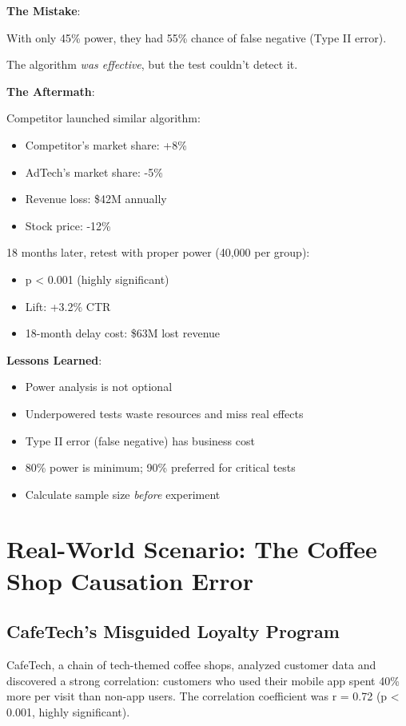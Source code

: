 \textbf{The Mistake}:

With only 45\% power, they had 55\% chance of false negative (Type II error).

The algorithm \textit{was effective}, but the test couldn't detect it.

\textbf{The Aftermath}:

Competitor launched similar algorithm:
\begin{itemize}
    \item Competitor's market share: +8\%
    \item AdTech's market share: -5\%
    \item Revenue loss: \$42M annually
    \item Stock price: -12\%
\end{itemize}

18 months later, retest with proper power (40,000 per group):
\begin{itemize}
    \item p < 0.001 (highly significant)
    \item Lift: +3.2\% CTR
    \item 18-month delay cost: \$63M lost revenue
\end{itemize}

\textbf{Lessons Learned}:
\begin{itemize}
    \item Power analysis is not optional
    \item Underpowered tests waste resources and miss real effects
    \item Type II error (false negative) has business cost
    \item 80\% power is minimum; 90\% preferred for critical tests
    \item Calculate sample size \textit{before} experiment
\end{itemize}

\section{Real-World Scenario: The Coffee Shop Causation Error}

\subsection{CafeTech's Misguided Loyalty Program}

CafeTech, a chain of tech-themed coffee shops, analyzed customer data and discovered a strong correlation: customers who used their mobile app spent 40\% more per visit than non-app users. The correlation coefficient was r = 0.72 (p < 0.001, highly significant).

